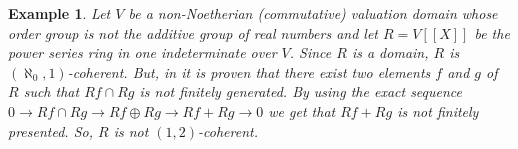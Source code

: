 \documentclass{amsart}
\newtheorem{example}[theorem]{Example}
\begin{document}
\begin{example}
Let $V$ be a non-Noetherian (commutative) valuation domain whose  order group is not the additive group of real numbers and let $R=V[[X]]$ be the power series ring in one indeterminate over $V$. Since $R$ is a domain, $R$ is $(\aleph_0,1)$-coherent. But, in \cite{AnWa87} it is proven that there exist two elements $f$ and $g$ of $R$ such that $Rf\cap Rg$ is not finitely generated. By using the exact sequence $0\rightarrow Rf\cap Rg\rightarrow Rf\oplus Rg\rightarrow Rf+Rg\rightarrow 0$ we get that $Rf+Rg$ is not finitely presented. So, $R$ is not $(1,2)$-coherent.
\end{example}
\end{document}
